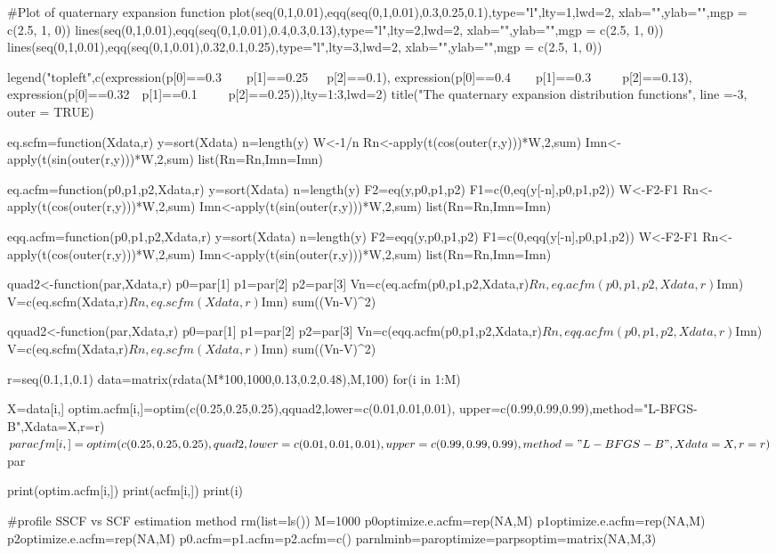 #Plot of quaternary expansion function
plot(seq(0,1,0.01),eqq(seq(0,1,0.01),0.3,0.25,0.1),type="l",lty=1,lwd=2,
xlab="",ylab="",mgp = c(2.5, 1, 0))
lines(seq(0,1,0.01),eqq(seq(0,1,0.01),0.4,0.3,0.13),type="l",lty=2,lwd=2,
xlab="",ylab="",mgp = c(2.5, 1, 0))
lines(seq(0,1,0.01),eqq(seq(0,1,0.01),0.32,0.1,0.25),type="l",lty=3,lwd=2,
xlab="",ylab="",mgp = c(2.5, 1, 0))

legend("topleft",c(expression(p[0]==0.3~~~~p[1]==0.25~~~p[2]==0.1),
expression(p[0]==0.4~~~~p[1]==0.3~~~~~p[2]==0.13),
expression(p[0]==0.32~~p[1]==0.1~~~~~p[2]==0.25)),lty=1:3,lwd=2)
title("The quaternary expansion distribution functions", line =-3, outer = TRUE)

eq.scfm=function(Xdata,r){
   y=sort(Xdata)
   n=length(y)
   W<-1/n
   Rn<-apply(t(cos(outer(r,y)))*W,2,sum)
   Imn<-apply(t(sin(outer(r,y)))*W,2,sum)
   list(Rn=Rn,Imn=Imn)
}

eq.acfm=function(p0,p1,p2,Xdata,r){
   y=sort(Xdata)
   n=length(y)
   F2=eq(y,p0,p1,p2)
   F1=c(0,eq(y[-n],p0,p1,p2))
   W<-F2-F1
   Rn<-apply(t(cos(outer(r,y)))*W,2,sum)
   Imn<-apply(t(sin(outer(r,y)))*W,2,sum)
   list(Rn=Rn,Imn=Imn)
}

eqq.acfm=function(p0,p1,p2,Xdata,r){
   y=sort(Xdata)
   n=length(y)
   F2=eqq(y,p0,p1,p2)
   F1=c(0,eqq(y[-n],p0,p1,p2))
   W<-F2-F1
   Rn<-apply(t(cos(outer(r,y)))*W,2,sum)
   Imn<-apply(t(sin(outer(r,y)))*W,2,sum)
   list(Rn=Rn,Imn=Imn)
}

quad2<-function(par,Xdata,r){
    p0=par[1]
    p1=par[2]
    p2=par[3]
    Vn=c(eq.acfm(p0,p1,p2,Xdata,r)$Rn,eq.acfm(p0,p1,p2,Xdata,r)$Imn)
    V=c(eq.scfm(Xdata,r)$Rn,eq.scfm(Xdata,r)$Imn)
    sum((Vn-V)^2)
}

qquad2<-function(par,Xdata,r){
    p0=par[1]
    p1=par[2]
    p2=par[3]
    Vn=c(eqq.acfm(p0,p1,p2,Xdata,r)$Rn,eqq.acfm(p0,p1,p2,Xdata,r)$Imn)
    V=c(eq.scfm(Xdata,r)$Rn,eq.scfm(Xdata,r)$Imn)
    sum((Vn-V)^2)
}

r=seq(0.1,1,0.1)
data=matrix(rdata(M*100,1000,0.13,0.2,0.48),M,100)
 for(i in 1:M)
 {
  X=data[i,]
  optim.acfm[i,]=optim(c(0.25,0.25,0.25),qquad2,lower=c(0.01,0.01,0.01),
  upper=c(0.99,0.99,0.99),method="L-BFGS-B",Xdata=X,r=r)$par
  acfm[i,]=optim(c(0.25,0.25,0.25),quad2,lower=c(0.01,0.01,0.01),
  upper=c(0.99,0.99,0.99),method="L-BFGS-B",Xdata=X,r=r)$par

  print(optim.acfm[i,])
  print(acfm[i,])
  print(i)
}

#profile SSCF vs SCF estimation method 
rm(list=ls())
M=1000
p0optimize.e.acfm=rep(NA,M)
p1optimize.e.acfm=rep(NA,M)
p2optimize.e.acfm=rep(NA,M)
p0.acfm=p1.acfm=p2.acfm=c()
parnlminb=paroptimize=parpsoptim=matrix(NA,M,3)

